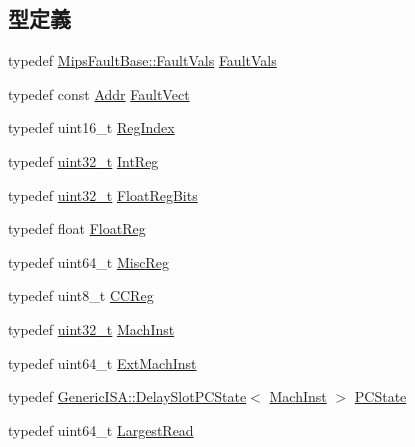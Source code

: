 \subsection*{型定義}
\begin{DoxyCompactItemize}
\item 
typedef \hyperlink{structMipsISA_1_1MipsFaultBase_1_1FaultVals}{MipsFaultBase::FaultVals} \hyperlink{namespaceMipsISA_a76768ab93f86c2f9bfab9c40269382e7}{FaultVals}
\item 
typedef const \hyperlink{classm5_1_1params_1_1Addr}{Addr} \hyperlink{namespaceMipsISA_a5c26c9764cc05486454998efadf79833}{FaultVect}
\item 
typedef uint16\_\-t \hyperlink{namespaceMipsISA_a69329e1d929a534ff51be6cf8216b69a}{RegIndex}
\item 
typedef \hyperlink{Type_8hh_a435d1572bf3f880d55459d9805097f62}{uint32\_\-t} \hyperlink{namespaceMipsISA_adf027691dfdcdef6002693b1e033700d}{IntReg}
\item 
typedef \hyperlink{Type_8hh_a435d1572bf3f880d55459d9805097f62}{uint32\_\-t} \hyperlink{namespaceMipsISA_acc2693113a7cf1a4ff1c9d63b7de6451}{FloatRegBits}
\item 
typedef float \hyperlink{namespaceMipsISA_a449d6bb660f5ca613cf359f05d81a20f}{FloatReg}
\item 
typedef uint64\_\-t \hyperlink{namespaceMipsISA_aa16539aa6584fd12f7d6fa868f75b4de}{MiscReg}
\item 
typedef uint8\_\-t \hyperlink{namespaceMipsISA_a5834599c0196ce4accda8049e7320621}{CCReg}
\item 
typedef \hyperlink{Type_8hh_a435d1572bf3f880d55459d9805097f62}{uint32\_\-t} \hyperlink{namespaceMipsISA_a301c22ea09fa33dcfe6ddf22f203699c}{MachInst}
\item 
typedef uint64\_\-t \hyperlink{namespaceMipsISA_aec686c38e40c7f794f1435591c15c275}{ExtMachInst}
\item 
typedef \hyperlink{classGenericISA_1_1DelaySlotPCState}{GenericISA::DelaySlotPCState}$<$ \hyperlink{namespaceMipsISA_a301c22ea09fa33dcfe6ddf22f203699c}{MachInst} $>$ \hyperlink{namespaceMipsISA_a2435b8311a00a8168bb1d33fb7c79b1e}{PCState}
\item 
typedef uint64\_\-t \hyperlink{namespaceMipsISA_a13e8c318dd29afdaf79751a072344db8}{LargestRead}
\end{DoxyCompactItemize}

